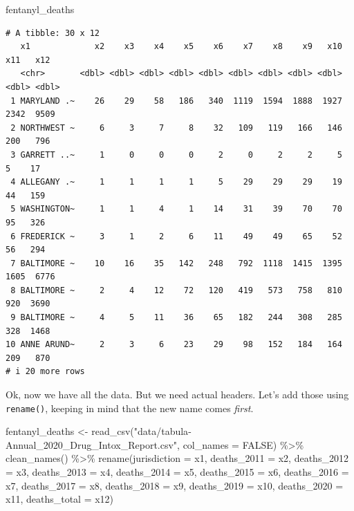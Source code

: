 \documentclass[
  letterpaper,
  DIV=11,
  numbers=noendperiod]{scrreprt}
\newenvironment{Shaded}{\begin{snugshade}}{\end{snugshade}}
\newcommand{\AttributeTok}[1]{\textcolor[rgb]{0.40,0.45,0.13}{#1}}
\newcommand{\ConstantTok}[1]{\textcolor[rgb]{0.56,0.35,0.01}{#1}}
\newcommand{\FunctionTok}[1]{\textcolor[rgb]{0.28,0.35,0.67}{#1}}
\newcommand{\NormalTok}[1]{\textcolor[rgb]{0.00,0.23,0.31}{#1}}
\newcommand{\OtherTok}[1]{\textcolor[rgb]{0.00,0.23,0.31}{#1}}
\newcommand{\SpecialCharTok}[1]{\textcolor[rgb]{0.37,0.37,0.37}{#1}}
\newcommand{\StringTok}[1]{\textcolor[rgb]{0.13,0.47,0.30}{#1}}
\begin{document}
\begin{Shaded}
\begin{Highlighting}[]
\NormalTok{fentanyl\_deaths}
\end{Highlighting}
\end{Shaded}

\begin{verbatim}
# A tibble: 30 x 12
   x1             x2    x3    x4    x5    x6    x7    x8    x9   x10   x11   x12
   <chr>       <dbl> <dbl> <dbl> <dbl> <dbl> <dbl> <dbl> <dbl> <dbl> <dbl> <dbl>
 1 MARYLAND .~    26    29    58   186   340  1119  1594  1888  1927  2342  9509
 2 NORTHWEST ~     6     3     7     8    32   109   119   166   146   200   796
 3 GARRETT ..~     1     0     0     0     2     0     2     2     5     5    17
 4 ALLEGANY .~     1     1     1     1     5    29    29    29    19    44   159
 5 WASHINGTON~     1     1     4     1    14    31    39    70    70    95   326
 6 FREDERICK ~     3     1     2     6    11    49    49    65    52    56   294
 7 BALTIMORE ~    10    16    35   142   248   792  1118  1415  1395  1605  6776
 8 BALTIMORE ~     2     4    12    72   120   419   573   758   810   920  3690
 9 BALTIMORE ~     4     5    11    36    65   182   244   308   285   328  1468
10 ANNE ARUND~     2     3     6    23    29    98   152   184   164   209   870
# i 20 more rows
\end{verbatim}

Ok, now we have all the data. But we need actual headers. Let's add
those using \texttt{rename()}, keeping in mind that the new name comes
\emph{first}.

\begin{Shaded}
\begin{Highlighting}[]
\NormalTok{fentanyl\_deaths }\OtherTok{\textless{}{-}} \FunctionTok{read\_csv}\NormalTok{(}\StringTok{"data/tabula{-}Annual\_2020\_Drug\_Intox\_Report.csv"}\NormalTok{, }\AttributeTok{col\_names =} \ConstantTok{FALSE}\NormalTok{) }\SpecialCharTok{\%\textgreater{}\%} 
  \FunctionTok{clean\_names}\NormalTok{() }\SpecialCharTok{\%\textgreater{}\%} 
  \FunctionTok{rename}\NormalTok{(}\AttributeTok{jurisdiction =}\NormalTok{ x1, }\AttributeTok{deaths\_2011 =}\NormalTok{ x2, }\AttributeTok{deaths\_2012 =}\NormalTok{ x3, }\AttributeTok{deaths\_2013 =}\NormalTok{ x4, }\AttributeTok{deaths\_2014 =}\NormalTok{ x5, }\AttributeTok{deaths\_2015 =}\NormalTok{ x6, }\AttributeTok{deaths\_2016 =}\NormalTok{ x7, }\AttributeTok{deaths\_2017 =}\NormalTok{ x8, }
         \AttributeTok{deaths\_2018 =}\NormalTok{ x9, }\AttributeTok{deaths\_2019 =}\NormalTok{ x10, }\AttributeTok{deaths\_2020 =}\NormalTok{ x11, }\AttributeTok{deaths\_total =}\NormalTok{ x12)}
\end{Highlighting}
\end{Shaded}
\end{document}
